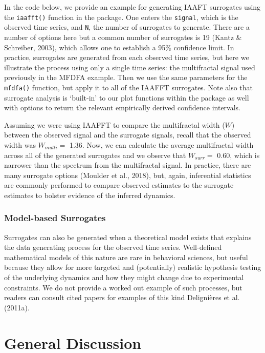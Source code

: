 \documentclass[
  man]{apa6}
\begin{document}
In the code below, we provide an example for generating IAAFT surrogates
using the \texttt{iaafft()} function in the package. One enters the \texttt{signal},
which is the observed time series, and \texttt{N}, the number of surrogates to
generate. There are a number of options here but a common number of
surrogates is 19 (Kantz \& Schreiber, 2003), which allows one to establish a 95\%
confidence limit. In practice, surrogates are generated from each
observed time series, but here we illustrate the process using only a
single time series: the multifractal signal used previously in the MFDFA
example. Then we use the same parameters for the \texttt{mfdfa()} function, but
apply it to all of the IAAFFT surrogates. Note also that surrogate
analysis is `built-in' to our plot functions within the package as well
with options to return the relevant empirically derived confidence
intervals.

Assuming we were using IAAFFT to compare the multifractal width (\(W\))
between the observed signal and the surrogate signals, recall that the
observed width was \(W_{multi} =\)
1.36. Now, we can
calculate the average multifractal width across all of the generated
surrogates and we observe that \(W_{surr} =\) 0.60, which is
narrower than the spectrum from the multifractal signal. In practice,
there are many surrogate options (Moulder et al., 2018), but, again, inferential
statistics are commonly performed to compare observed estimates to the
surrogate estimates to bolster evidence of the inferred dynamics.

\hypertarget{model-based-surrogates}{%
\subsubsection{Model-based Surrogates}\label{model-based-surrogates}}

Surrogates can also be generated when a theoretical model exists that
explains the data generating process for the observed time series.
Well-defined mathematical models of this nature are rare in behavioral
sciences, but useful because they allow for more targeted and
(potentially) realistic hypothesis testing of the underlying dynamics
and how they might change due to experimental constraints. We do not
provide a worked out example of such processes, but readers can consult
cited papers for examples of this kind Delignières et al. (2011a).

\hypertarget{general-discussion}{%
\section{General Discussion}\label{general-discussion}}
\end{document}
